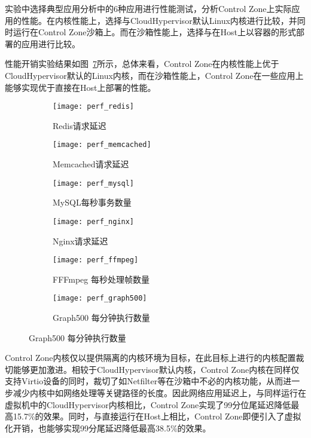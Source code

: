 实验中选择典型应用分析中的6种应用进行性能测试，分析Control Zone上实际应用的性能。在内核性能上，选择与CloudHypervisor默认Linux内核进行比较，并同时运行在Control Zone沙箱上。而在沙箱性能上，选择与在Host上以容器的形式部署的应用进行比较。

性能开销实验结果如图~\ref{fig:perf_app}所示，总体来看，Control Zone在内核性能上优于CloudHypervisor默认的Linux内核，而在沙箱性能上，Control Zone在一些应用上能够实现优于直接在Host上部署的性能。

\begin{figure}[!htbp]
    \centering
    \begin{subfigure}[b]{0.32\textwidth}
        \texttt{[image: perf\_redis]}
        \caption{\quad Redis请求延迟}
        \label{fig:perf_redis}
    \end{subfigure}
    \begin{subfigure}[b]{0.32\textwidth}
        \texttt{[image: perf\_memcached]}
        \caption{\quad Memcached请求延迟}
        \label{fig:perf_memcached}
    \end{subfigure}
    \begin{subfigure}[b]{0.32\textwidth}
        \texttt{[image: perf\_mysql]}
        \caption{\quad MySQL每秒事务数量}
        \label{fig:perf_mysql}
    \end{subfigure}
    \begin{subfigure}[b]{0.32\textwidth}
        \texttt{[image: perf\_nginx]}
        \caption{\quad Nginx请求延迟}
        \label{fig:perf_nginx}
    \end{subfigure}
    \begin{subfigure}[b]{0.32\textwidth}
        \texttt{[image: perf\_ffmpeg]}
        \caption{\quad FFFmpeg 每秒处理帧数量}
        \label{fig:perf_ffmpeg}
    \end{subfigure}
    \begin{subfigure}[b]{0.32\textwidth}
        \texttt{[image: perf\_graph500]}
        \caption{\quad Graph500 每分钟执行数量}
        \label{fig:perf_graph500}
    \end{subfigure}
\label{fig:perf_app}
\end{figure}

Control Zone内核仅以提供隔离的内核环境为目标，在此目标上进行的内核配置裁切能够更加激进。相较于CloudHypervisor默认内核，Control Zone内核在同样仅支持Virtio设备的同时，裁切了如Netfilter等在沙箱中不必的内核功能，从而进一步减少内核中如网络处理等关键路径的长度。因此网络应用延迟上，与同样运行在虚拟机中的CloudHypervisor内核相比，Control Zone实现了99分位尾延迟降低最高15.7\%的效果。同时，与直接运行在Host上相比，Control Zone即便引入了虚拟化开销，也能够实现99分尾延迟降低最高38.5\%的效果。

